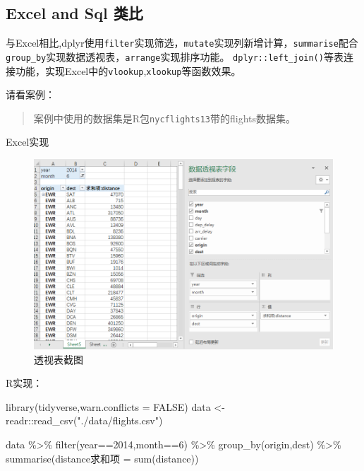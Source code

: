 \documentclass[
]{book}
\newenvironment{Shaded}{\begin{snugshade}}{\end{snugshade}}
\newcommand{\AttributeTok}[1]{\textcolor[rgb]{0.77,0.63,0.00}{#1}}
\newcommand{\ConstantTok}[1]{\textcolor[rgb]{0.00,0.00,0.00}{#1}}
\newcommand{\DecValTok}[1]{\textcolor[rgb]{0.00,0.00,0.81}{#1}}
\newcommand{\FunctionTok}[1]{\textcolor[rgb]{0.00,0.00,0.00}{#1}}
\newcommand{\NormalTok}[1]{#1}
\newcommand{\OtherTok}[1]{\textcolor[rgb]{0.56,0.35,0.01}{#1}}
\newcommand{\SpecialCharTok}[1]{\textcolor[rgb]{0.00,0.00,0.00}{#1}}
\newcommand{\StringTok}[1]{\textcolor[rgb]{0.31,0.60,0.02}{#1}}
\begin{document}
\hypertarget{dplyr:difference-of-sql}{%
\subsection{Excel and Sql 类比}\label{dplyr:difference-of-sql}}

与Excel相比,dplyr使用\texttt{filter}实现筛选，\texttt{mutate}实现列新增计算，\texttt{summarise}配合\texttt{group\_by}实现数据透视表，\texttt{arrange}实现排序功能。
\texttt{dplyr::left\_join()}等表连接功能，实现Excel中的\texttt{vlookup},\texttt{xlookup}等函数效果。

请看案例：

\begin{quote}
案例中使用的数据集是R包\texttt{nycflights13}带的flights数据集。
\end{quote}

Excel实现

\begin{figure}
\centering
\includegraphics{./picture/data-table/01picture.png}
\caption{透视表截图}
\end{figure}

R实现：

\begin{Shaded}
\begin{Highlighting}[]
\FunctionTok{library}\NormalTok{(tidyverse,}\AttributeTok{warn.conflicts =} \ConstantTok{FALSE}\NormalTok{)}
\NormalTok{data }\OtherTok{\textless{}{-}}\NormalTok{ readr}\SpecialCharTok{::}\FunctionTok{read\_csv}\NormalTok{(}\StringTok{"./data/flights.csv"}\NormalTok{)}

\NormalTok{data }\SpecialCharTok{\%\textgreater{}\%} 
  \FunctionTok{filter}\NormalTok{(year}\SpecialCharTok{==}\DecValTok{2014}\NormalTok{,month}\SpecialCharTok{==}\DecValTok{6}\NormalTok{) }\SpecialCharTok{\%\textgreater{}\%} 
  \FunctionTok{group\_by}\NormalTok{(origin,dest) }\SpecialCharTok{\%\textgreater{}\%} 
  \FunctionTok{summarise}\NormalTok{(distance求和项 }\OtherTok{=} \FunctionTok{sum}\NormalTok{(distance))}
\end{Highlighting}
\end{Shaded}
\end{document}
